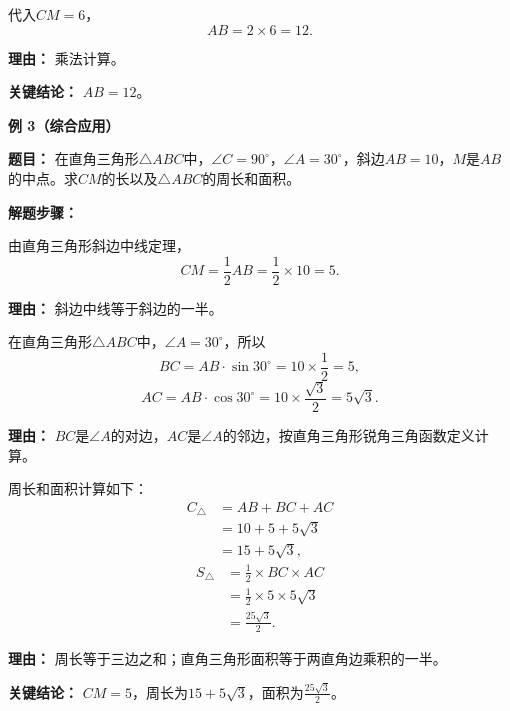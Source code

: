 \begin{examplebox}
\begin{description}[style=nextline, leftmargin=2.8em, labelsep=0.5em, itemsep=0.45em]
		\item[\textbf{第三步（计算）：}] 代入$CM=6$，
		      \[
			      AB = 2 \times 6 = 12.
		      \]
		      \par\textbf{理由：}
		      乘法计算。
	\end{description}

	\textbf{\textcolor{CExample}{关键结论：}} $AB=12$。

	\medskip
	\textbf{\textcolor{CExample}{例 3（综合应用）}}

	\textbf{\textcolor{CExample}{题目：}} 在直角三角形$\triangle ABC$中，$\angle C=90^\circ$，$\angle A=30^\circ$，斜边$AB=10$，$M$是$AB$的中点。求$CM$的长以及$\triangle ABC$的周长和面积。

	\textbf{\textcolor{CExample}{解题步骤：}}
	\begin{description}[style=nextline, leftmargin=2.8em, labelsep=0.5em, itemsep=0.45em]
		\item[\textbf{第一步（求中线长）：}] 由直角三角形斜边中线定理，
		      \[
			      CM = \frac12 AB = \frac12 \times 10 = 5.
		      \]
		      \par\textbf{理由：}
		      斜边中线等于斜边的一半。

		\item[\textbf{第二步（求直角边）：}] 在直角三角形$\triangle ABC$中，$\angle A=30^\circ$，所以
		      \[
			      BC = AB \cdot \sin30^\circ = 10 \times \frac12 = 5,
		      \]
		      \[
			      AC = AB \cdot \cos30^\circ = 10 \times \frac{\sqrt3}{2} = 5\sqrt3.
		      \]
		      \par\textbf{理由：}
		      $BC$是$\angle A$的对边，$AC$是$\angle A$的邻边，按直角三角形锐角三角函数定义计算。

		\item[\textbf{第三步（求周长和面积）：}]
		      周长和面积计算如下：
		      \[
			      \begin{aligned}
				      C_{\triangle} & = AB + BC + AC     \\
				                    & = 10 + 5 + 5\sqrt3 \\
				                    & = 15 + 5\sqrt3,
			      \end{aligned}
		      \]
		      \[
			      \begin{aligned}
				      S_{\triangle} & = \frac12 \times BC \times AC     \\
				                    & = \frac12 \times 5 \times 5\sqrt3 \\
				                    & = \frac{25\sqrt3}{2}.
			      \end{aligned}
		      \]
		      \par\textbf{理由：}
		      周长等于三边之和；直角三角形面积等于两直角边乘积的一半。
	\end{description}

	\textbf{\textcolor{CExample}{关键结论：}} $CM=5$，周长为$15+5\sqrt3$，面积为$\frac{25\sqrt3}{2}$。
\end{examplebox}